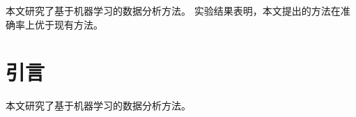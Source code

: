 \documentclass[degree=bachelor, blind=true]{sduthesis}
\begin{document}
\MakeCover

\begin{cnabstract}
  本文研究了基于机器学习的数据分析方法。
  实验结果表明，本文提出的方法在准确率上优于现有方法。
\end{cnabstract}

\tableofcontents

\chapter{引言}
本文研究了基于机器学习的数据分析方法。


\nocite{*}


\MakeDeclaration
\end{document}

